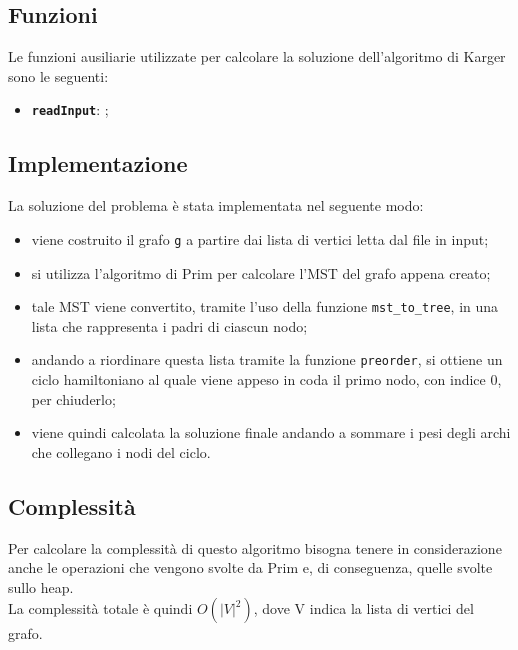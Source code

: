 \subsection{Funzioni}
	
	Le funzioni ausiliarie utilizzate per calcolare la soluzione dell'algoritmo di Karger sono le seguenti:
	\begin{itemize}
		\item \texttt{\textbf{readInput}}: ;
	\end{itemize}

\subsection{Implementazione}
	
	La soluzione del problema è stata implementata nel seguente modo:
	\begin{itemize}
		\item viene costruito il grafo \texttt{g} a partire dai lista di vertici letta dal file in input;
		\item si utilizza l'algoritmo di Prim per calcolare l'MST del grafo appena creato;
		\item tale MST viene convertito, tramite l'uso della funzione \texttt{mst\_to\_tree}, in una lista che rappresenta i padri di ciascun nodo;
		\item andando a riordinare questa lista tramite la funzione \texttt{preorder}, si ottiene un ciclo hamiltoniano al quale viene appeso in coda il primo nodo, con indice 0, per chiuderlo;
		\item viene quindi calcolata la soluzione finale andando a sommare i pesi degli archi che collegano i nodi del ciclo.
	\end{itemize}
		
\subsection{Complessità}

	Per calcolare la complessità di questo algoritmo bisogna tenere in considerazione anche le operazioni che vengono svolte da Prim e, di conseguenza, quelle svolte sullo heap.\\
	La complessità totale è quindi $O(|V|^2)$, dove V indica la lista di vertici del grafo.

\pagebreak